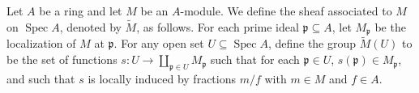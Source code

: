 Let $A$ be a ring and let $M$ be an $A$-module. We define the sheaf associated to $M$ on $\operatorname{Spec} A$, denoted by $\widetilde{M}$, as follows. For each prime ideal $\mathfrak{p} \subseteq A$, let $M_{\mathfrak{p}}$ be the localization of $M$ at $\mathfrak{p}$. For any open set $U \subseteq \operatorname{Spec} A$, define the group $\widetilde{M}(U)$ to be the set of functions $s: U \to \coprod_{\mathfrak{p} \in U} M_{\mathfrak{p}}$ such that for each $\mathfrak{p} \in U$, $s(\mathfrak{p}) \in M_{\mathfrak{p}}$, and such that $s$ is locally induced by fractions $m/f$ with $m \in M$ and $f \in A$.
